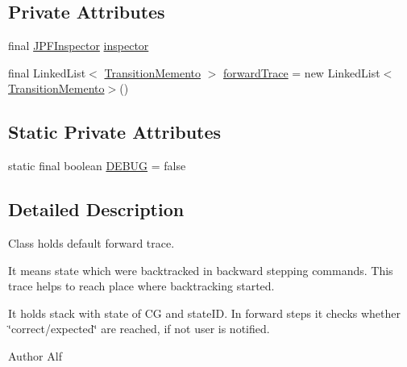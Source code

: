 \subsection*{Private Attributes}
\begin{DoxyCompactItemize}
\item 
final \hyperlink{classgov_1_1nasa_1_1jpf_1_1inspector_1_1server_1_1jpf_1_1_j_p_f_inspector}{J\+P\+F\+Inspector} \hyperlink{classgov_1_1nasa_1_1jpf_1_1inspector_1_1server_1_1breakpoints_1_1_default_forward_trace_manager_a7a495164429696989989854362749bcb}{inspector}
\item 
final Linked\+List$<$ \hyperlink{classgov_1_1nasa_1_1jpf_1_1inspector_1_1server_1_1breakpoints_1_1_default_forward_trace_manager_1_1_transition_memento}{Transition\+Memento} $>$ \hyperlink{classgov_1_1nasa_1_1jpf_1_1inspector_1_1server_1_1breakpoints_1_1_default_forward_trace_manager_ae2746ab2733a47bce8ee3fe677d6e396}{forward\+Trace} = new Linked\+List$<$\hyperlink{classgov_1_1nasa_1_1jpf_1_1inspector_1_1server_1_1breakpoints_1_1_default_forward_trace_manager_1_1_transition_memento}{Transition\+Memento}$>$()
\end{DoxyCompactItemize}
\subsection*{Static Private Attributes}
\begin{DoxyCompactItemize}
\item 
static final boolean \hyperlink{classgov_1_1nasa_1_1jpf_1_1inspector_1_1server_1_1breakpoints_1_1_default_forward_trace_manager_a7ab6cf030f9e6b331c4403bfb79e2fd0}{D\+E\+B\+UG} = false
\end{DoxyCompactItemize}


\subsection{Detailed Description}
Class holds default forward trace. 

It means state which were backtracked in backward stepping commands. This trace helps to reach place where backtracking started.

It holds stack with state of CG and state\+ID. In forward steps it checks whether \char`\"{}correct/expected\char`\"{} are reached, if not user is notified.

\begin{DoxyAuthor}{Author}
Alf 
\end{DoxyAuthor}


